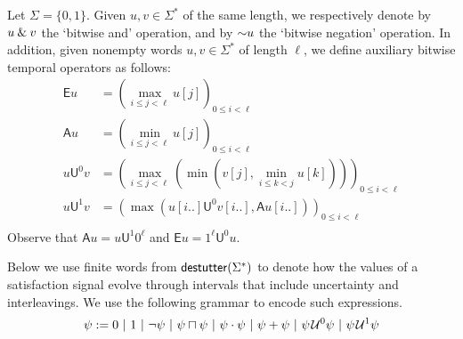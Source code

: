 Let $\Sigma = \{0,1\}$.
Given $u,v \in \Sigma^*$ of the same length, we respectively denote by $u \mathbin{\&} v$ the `bitwise and' operation, and by $\mathord{\sim} u$ the `bitwise negation' operation.
In addition, given nonempty words $u,v \in \Sigma^*$ of length $\ell$, we define auxiliary bitwise temporal operators as follows:
\begin{align*}
\mathsf{E} u &= \left( \max_{i \leq j < \ell} u[j] \right)_{0 \leq i < \ell} \\
\mathsf{A} u &= \left( \min_{i \leq j < \ell} u[j] \right)_{0 \leq i < \ell} \\
u \mathsf{U}^0 v &= \left( \max_{i \leq j < \ell} \left( \min \left( v[j], \min_{i \leq k < j} u[k] \right) \right) \right)_{0 \leq i < \ell} \\
u \mathsf{U}^1 v &= \left( \max \left( u[i..] \mathsf{U}^0 v[i..], \mathsf{A} u[i..] \right) \right)_{0 \leq i < \ell} \\
\end{align*}
Observe that $\mathsf{A} u = u \mathsf{U}^1 0^\ell$ and $\mathsf{E} u = 1^\ell \mathsf{U}^0 u$.

Below we use finite words from $\mathsf{destutter}(\Sigma^*)$ to denote how the values of a satisfaction signal evolve through intervals that include uncertainty and interleavings.
We use the following grammar to encode such expressions.
$$ \psi := 0 ~|~ 1 ~|~ \lnot \psi ~|~ \psi \sqcap \psi  ~|~ \psi \cdot \psi ~|~ \psi + \psi ~|~ \psi \kern.1em\mathcal{U}^0 \psi ~|~ \psi \kern.1em\mathcal{U}^1 \psi $$ %

